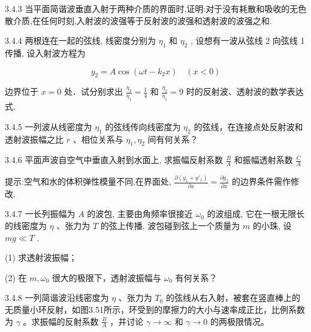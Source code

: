 \begin{problem}{3.4.3}
当平面简谐波垂直入射于两种介质的界面时,证明:对于没有耗散和吸收的无色散介质,在任何时刻,入射波的波强等于反射波的波强和透射波的波强之和.
\end{problem}
\clearpage


\begin{problem}{3.4.4}
两根连在一起的弦线, 线密度分别为 $\eta_{1}$ 和 $\eta_{2}$ , 设想有一波从弦线 2 向弦线 1 传播, 设入射波方程为

\[
y _ {2} = A \cos (\omega t - k _ {2} x) \quad (x <   0)
\]

边界位于 $x = 0$ 处．试分别求出 $\frac{\eta_2}{\eta_1} = \frac{1}{4}$ 和 $\frac{\eta_2}{\eta_1} = 9$ 时的反射波、透射波的数学表达式.
\end{problem}
\clearpage


\begin{problem}{3.4.5}
一列波从线密度为 $\eta_{1}$ 的弦线传向线密度为 $\eta_{2}$ 的弦线，在连接点处反射波和透射波振幅之比 $r$ 、相位关系与 $\eta_{1}, \eta_{2}$ 间有何关系？
\end{problem}
\clearpage


\begin{problem}{3.4.6}
平面声波自空气中垂直入射到水面上, 求振幅反射系数 $\frac{B}{A}$ 和振幅透射系数 $\frac{C}{A}$ 

提示:空气和水的体积弹性模量不同,在界面处, $\frac{\partial(y_{1}+y'_{1})}{\partial x}=\frac{\partial y_{2}}{\partial x}$ 的边界条件需作修改.
\end{problem}
\clearpage


\begin{problem}{3.4.7}
一长列振幅为 $A$ 的波包, 主要由角频率很接近 $\omega_0$ 的波组成, 它在一根无限长的线密度为 $\eta$ 、张力为 $T$ 的弦上传播. 波包碰到弦上一个质量为 $m$ 的小珠, 设 $mg \ll T$ .

(1) 求透射波振幅；

(2) 在 $m, \omega_{0}$ 很大的极限下，透射波振幅与 $\omega_{0}$ 有何关系？
\begin{center}

\end{center}
\end{problem}
\clearpage


\begin{problem}{3.4.8}
一列简谐波沿线密度为 $\eta$ 、张力为 $T_0$ 的弦线从右入射，被套在竖直棒上的无质量小环反射，如图3.51所示，环受到的摩擦力的大小与速率成正比，比例系数为 $\gamma$ 。求振幅的反射系数 $\frac{B}{A}$ ，并讨论 $\gamma \to \infty$ 和 $\gamma \to 0$ 的两极限情况。
\begin{center}

\end{center}
\end{problem}
\clearpage


